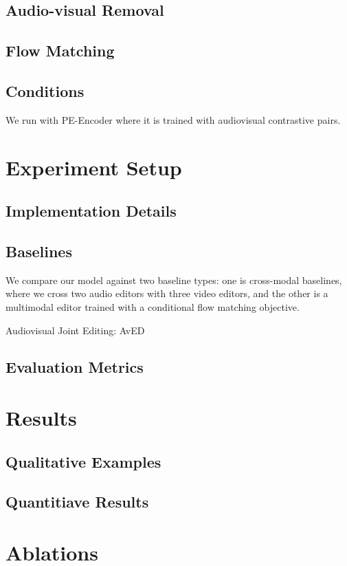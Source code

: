 \documentclass{article}
\begin{document}
\subsection{Audio-visual Removal}


\subsection{Flow Matching}


\subsection{Conditions}
We run with PE-Encoder\citep{bolya2025perceptionencoderbestvisual} where it is trained with audiovisual contrastive pairs. 

\section{Experiment Setup}
\subsection{Implementation Details}
\subsection{Baselines}
We compare our model against two baseline types: one is cross-modal baselines, where we cross two audio editors with three video editors, and the other is a multimodal editor trained with a conditional flow matching objective. 

Audiovisual Joint Editing\citep{lin2025zeroshotaudiovisualeditingcrossmodal}: AvED


\subsection{Evaluation Metrics}

\section{Results}
\subsection{Qualitative Examples}
\subsection{Quantitiave Results}
\section{Ablations}
\end{document}
